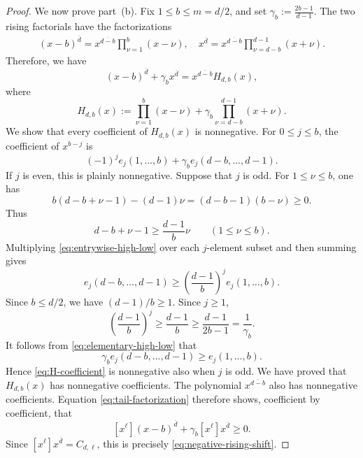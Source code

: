 \documentclass[10pt,a4paper]{amsart}
\begin{document}
\begin{proof}
We now prove part~(b).  Fix $1\leq b\leq m=d/2$, and set $\gamma_b:=\frac{2b-1}{d-1}$.
The two rising factorials have the factorizations
\begin{align*}
 (x-b)^{\overline d}=x^{\overline{d-b}}\prod_{\nu=1}^{b}(x-\nu),\quad
 x^{\overline d}=x^{\overline{d-b}}\prod_{\nu=d-b}^{d-1}(x+\nu).
\end{align*}
Therefore, we have 
\begin{equation}\label{eq:tail-factorization}
 (x-b)^{\overline d}+\gamma_bx^{\overline d}=x^{\overline{d-b}}H_{d,b}(x),
\end{equation}
where
\[ H_{d,b}(x) :=\prod_{\nu=1}^{b}(x-\nu) +\gamma_b\prod_{\nu=d-b}^{d-1}(x+\nu).
\]
We show that every coefficient of $H_{d,b}(x)$ is nonnegative.  For $0\leq j\leq b$, the coefficient of $x^{b-j}$ is
\begin{equation}\label{eq:H-coefficient}
 (-1)^je_j(1,\ldots,b)+\gamma_be_j(d-b,\ldots,d-1).
\end{equation}
If $j$ is even, this is plainly nonnegative.  Suppose that $j$ is odd.
For $1\leq\nu\leq b$, one has
\[ b(d-b+\nu-1)-(d-1)\nu =(d-b-1)(b-\nu)\geq0.
\]
Thus
\begin{equation}\label{eq:entrywise-high-low}
d-b+\nu-1\geq\frac{d-1}{b}\nu\qquad(1\leq\nu\leq b).
\end{equation}
Multiplying \eqref{eq:entrywise-high-low} over each $j$-element subset and then summing gives
\begin{equation}\label{eq:elementary-high-low}
 e_j(d-b,\ldots,d-1)\geq\left(\frac{d-1}{b}\right)^je_j(1,\ldots,b).
\end{equation}
Since $b\leq d/2$, we have $(d-1)/b\geq1$.  Since $j\geq1$,
\[\left(\frac{d-1}{b}\right)^j\geq\frac{d-1}{b}\geq\frac{d-1}{2b-1}=\frac1{\gamma_b}.
\]
It follows from \eqref{eq:elementary-high-low} that
\[\gamma_be_j(d-b,\ldots,d-1)\geq e_j(1,\ldots,b).
\]
Hence \eqref{eq:H-coefficient} is nonnegative also when $j$ is odd.
We have proved that $H_{d,b}(x)$ has nonnegative coefficients.  The polynomial $x^{\overline{d-b}}$ also has nonnegative coefficients. Equation \eqref{eq:tail-factorization} therefore shows, coefficient by
coefficient, that
\[[x^\ell](x-b)^{\overline d}+\gamma_b[x^\ell]x^{\overline d}\geq0.
\]
Since $[x^\ell]x^{\overline d}=C_{d,\ell}$, this is precisely \eqref{eq:negative-rising-shift}.
\end{proof}
\end{document}

